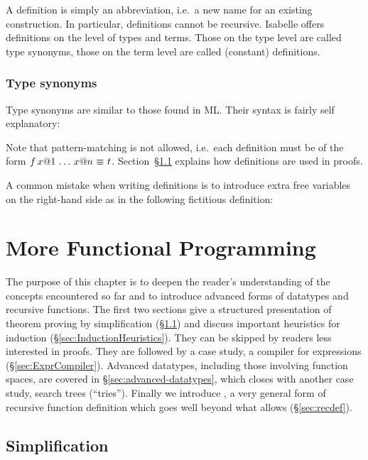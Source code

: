 A definition is simply an abbreviation, i.e.\ a new name for an existing
construction. In particular, definitions cannot be recursive. Isabelle offers
definitions on the level of types and terms. Those on the type level are
called type synonyms, those on the term level are called (constant)
definitions.


\subsection{Type synonyms}

Type synonyms are similar to those found in ML. Their syntax is fairly self
explanatory:

%

Note that pattern-matching is not allowed, i.e.\ each definition must be of
the form $f\,x@1\,\dots\,x@n~\emph{$\equiv$}~t$.
Section~\S\ref{sec:Simplification} explains how definitions are used
in proofs.

\begin{warn}%
A common mistake when writing definitions is to introduce extra free
variables on the right-hand side as in the following fictitious definition:
%
\end{warn}


\chapter{More Functional Programming}

The purpose of this chapter is to deepen the reader's understanding of the
concepts encountered so far and to introduce advanced forms of datatypes and
recursive functions. The first two sections give a structured presentation of
theorem proving by simplification (\S\ref{sec:Simplification}) and discuss
important heuristics for induction (\S\ref{sec:InductionHeuristics}). They can
be skipped by readers less interested in proofs. They are followed by a case
study, a compiler for expressions (\S\ref{sec:ExprCompiler}). Advanced
datatypes, including those involving function spaces, are covered in
\S\ref{sec:advanced-datatypes}, which closes with another case study, search
trees (``tries'').  Finally we introduce , a very general
form of recursive function definition which goes well beyond what
 allows (\S\ref{sec:recdef}).


\section{Simplification}
\label{sec:Simplification}

